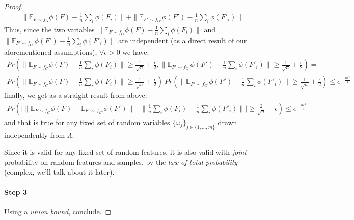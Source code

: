 \documentclass{article}
\begin{document}
\begin{proof}
\begin{align*}
    \| \mathbb{E}_{F \sim f_G} \phi(F) -  \frac{1}{n} \sum_i \phi(F_i) \|+ \|\mathbb{E}_{F' \sim f_{G'}} \phi(F') - \frac{1}{n} \sum_i \phi(F'_i)\|
\end{align*}
Thus, since the two variables $\| \mathbb{E}_{F \sim f_G} \phi(F) -  \frac{1}{n} \sum_i \phi(F_i) \|$ and $\|\mathbb{E}_{F' \sim f_{G'}} \phi(F') - \frac{1}{n} \sum_i \phi(F'_i)\|$ are independent (as a direct result of our aforementioned assumptions), $\forall \epsilon>0$ we have:
\begin{align*}
    Pr( \| \mathbb{E}_{F \sim f_G} \phi(F) -  \frac{1}{n} \sum_i \phi(F_i) \| \geq \frac{1}{\sqrt{n}}+\frac{\epsilon}{2}, \|\mathbb{E}_{F' \sim f_{G'}} \phi(F') - \frac{1}{n} \sum_i \phi(F'_i)\|\geq\frac{1}{\sqrt{n}}+\frac{\epsilon}{2})=\\
    Pr( \| \mathbb{E}_{F \sim f_G} \phi(F) -  \frac{1}{n} \sum_i \phi(F_i) \| \geq \frac{1}{\sqrt{n}}+\frac{\epsilon}{2})~Pr( \|\mathbb{E}_{F' \sim f_{G'}} \phi(F') - \frac{1}{n} \sum_i \phi(F'_i)\|\geq\frac{1}{\sqrt{n}}+\frac{\epsilon}{2})\leq 
    e^{-\frac{n\epsilon^2}{4}}
\end{align*}
finally, we get as a straight result from above:
\begin{align*}
    Pr(\Big | \| \mathbb{E}_{F \sim f_G} \phi(F) - \mathbb{E}_{F' \sim f_{G'}} \phi(F')\| - \| \frac{1}{n} \sum_i \phi(F_i) - \frac{1}{n} \sum_i \phi(F'_i)\|\Big | \geq
    \frac{2}{\sqrt{n}}+\epsilon)\leq e^{-\frac{n\epsilon^2}{4}}
\end{align*}
and that is true for any fixed set of random variables  $\{\omega_j\}_{j \in \{1,\ldots, m\}}$ drawn independently from $\Lambda$.



Since it is valid for any fixed set of random features, it is also valid with \emph{joint} probability on random features and samples, by the \emph{law of total probability} (complex, we'll talk about it later).

\paragraph{Step 3} Using a \emph{union bound}, conclude.

\end{proof}
\end{document}
